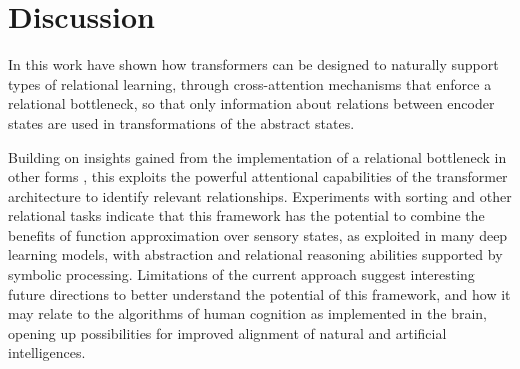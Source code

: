 \section{Discussion}
\label{sec:discuss}



In this work have shown how transformers can be designed to
naturally support types of relational learning, through cross-attention
mechanisms that enforce a relational bottleneck, so that only information about relations between encoder states
are used in transformations of the abstract states.

Building on insights gained from the implementation of a relational bottleneck in other forms \citep{esbn, kerg2022neural}, this exploits the powerful attentional capabilities of the transformer architecture to identify relevant relationships.
Experiments with sorting and other relational tasks indicate that this framework has the potential to combine the
benefits of function approximation over sensory states, as exploited in many deep learning models, with abstraction and relational reasoning abilities supported by symbolic processing.
Limitations of the current approach suggest interesting
future directions to better understand the potential of this framework, and
how it may relate to the algorithms of human cognition as implemented in the brain, opening up possibilities for 
improved alignment of natural and artificial intelligences.

